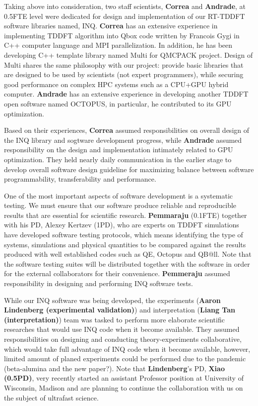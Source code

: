 Taking above into consideration, two staff scientists, {\bf Correa} and {\bf Andrade}, at 0.5FTE level were dedicated for design and implementation of our RT-TDDFT software libraries named, INQ. {\bf Correa} has an extensive experience in implementing TDDFT algorithm into Qbox code written by Francois Gygi in C++ computer language and MPI parallelization. In addition, he has been developing C++ template library named Multi for QMCPACK project. Design of Multi shares the same philosophy with our project: provide basic libraries that are designed to be used by scientists (not expert programmers), while securing good performance on complex HPC systems such as a CPU+GPU hybrid computer. {\bf Andrade} has an extensive experience in developing another TDDFT open software named OCTOPUS, in particular, he contributed to its GPU optimization.  

Based on their experiences, {\bf Correa} assumed responsibilities on overall design of the INQ library and sogtware development progress, while {\bf Andrade} assumed responsibility on the design and implementation intimately related to GPU optimization. They held nearly daily communication in the earlier stage to develop overall software design guideline for maximizing balance between software programmability, transferability and performance. 

One of the most important aspects of software development is a systematic testing. We must ensure that our software produce reliable and reproducible results that are essential for scientific research. {\bf Pemmaraju} (0.1FTE) together with his PD, Alexey Kertzev (1PD), who are experts on TDDFT simulations have developed software testing protocols, which means identifying the type of systems, simulations and physical quantities to be compared against the results produced with well established codes such as QE, Octopus and QB@ll. Note that the software testing suites will be distributed together with the software in order for the external collaborators for their convenience. {\bf Pemmeraju} assumed responsibility in designing and performing INQ software tests.


While our INQ software was being developed, the experiments ({\bf Aaron Lindenberg (experimental validation)}) and interpretation ({\bf Liang Tan (interpretation)}) team was tasked to perform more elaborate scientific researches that would use INQ code when it become available. They assumed responsibilities on designing and conducting theory-experiments collaborative, which would take full advantage of INQ code when it become available, however, limited amount of planed experiments could be performed due to the pandemic (beta-alumina and the new paper?). Note that {\bf Lindenberg}'s PD, {\bf Xiao (0.5PD)}, very recently started an assistant Professor position at University of Wisconsin, Madison and are planning to continue the collaboration with us on the subject of ultrafast science.

